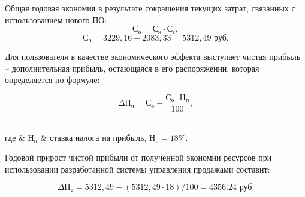 Общая годовая экономия в результате сокращения текущих затрат, связанных с использованием нового ПО:
\begin{equation}
  \text{С}_\text{о} = \text{С}_\text{н} \cdot \text{С}_\text{з},
\end{equation}
\begin{equation*}
  \text{С}_\text{о} = 3229,16 + 2083,33 = 5312,49 \text{ руб.}
\end{equation*}

Для пользователя в качестве экономического эффекта выступает чистая прибыль – дополнительная прибыль, остающаяся в его
распоряжении, которая определяется по формуле:

\begin{equation}
  \Delta\text{П}_\text{ч} = \text{С}_\text{о} - \frac{\text{С}_\text{о} \cdot \text{Н}_\text{п}}{100},
\end{equation}
\\[0pt]
\begin{explanation}
  где & $ \text{Н}_\text{п} $ & ставка налога на прибыль, $ \text{Н}_\text{п} = 18\% $.
\end{explanation}

Годовой прирост чистой прибыли от полученной экономии ресурсов при использовании разработанной системы управления
продажами составит:

\begin{equation*}
  \Delta\text{П}_\text{ч} = 5312,49 - (5312,49 \cdot 18)/100 = 4356.24 \text{ руб.}
\end{equation*}

